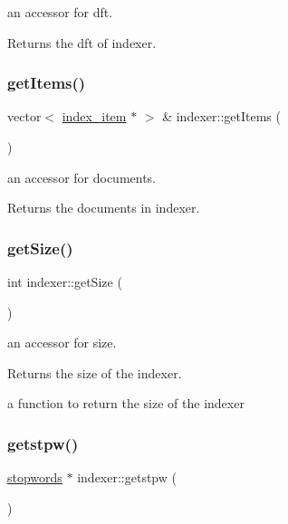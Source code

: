 an accessor for dft. 

\begin{DoxyReturn}{Returns}
the dft of indexer. 
\end{DoxyReturn}
\mbox{\label{classindexer_ad576259a08d87b8d4486793522a0ca5a}} 
\subsubsection{\texorpdfstring{get\+Items()}{getItems()}}
{\footnotesize\ttfamily vector$<$ \hyperlink{classindex__item}{index\+\_\+item} $\ast$ $>$ \& indexer\+::get\+Items (\begin{DoxyParamCaption}{ }\end{DoxyParamCaption})}



an accessor for documents. 

\begin{DoxyReturn}{Returns}
the documents in indexer. 
\end{DoxyReturn}
\mbox{\label{classindexer_ad9e5eee599f4677d7a6cca2f53aeec44}} 
\subsubsection{\texorpdfstring{get\+Size()}{getSize()}}
{\footnotesize\ttfamily int indexer\+::get\+Size (\begin{DoxyParamCaption}{ }\end{DoxyParamCaption})}



an accessor for size. 

\begin{DoxyReturn}{Returns}
the size of the indexer.
\end{DoxyReturn}
a function to return the size of the indexer \mbox{\label{classindexer_a78be8aabef768ba82208956e53316cc5}} 
\subsubsection{\texorpdfstring{getstpw()}{getstpw()}}
{\footnotesize\ttfamily \hyperlink{classstopwords}{stopwords} $\ast$ indexer\+::getstpw (\begin{DoxyParamCaption}{ }\end{DoxyParamCaption})}



